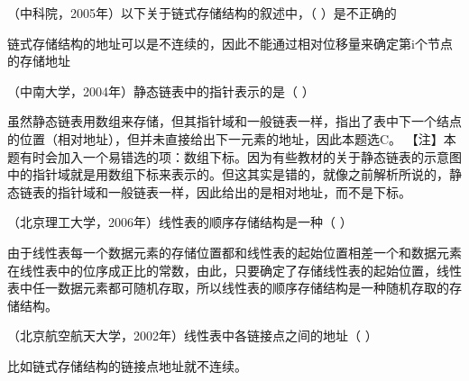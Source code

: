 \question （中科院，2005年）以下关于链式存储结构的叙述中，（ ）是不正确的
\par{}
\begin{solution}链式存储结构的地址可以是不连续的，因此不能通过相对位移量来确定第i个节点的存储地址
\end{solution}
\question （中南大学，2004年）静态链表中的指针表示的是（ ）
\par{}
\begin{solution}虽然静态链表用数组来存储，但其指针域和一般链表一样，指出了表中下一个结点的位置（相对地址），但并未直接给出下一元素的地址，因此本题选C。
【注】本题有时会加入一个易错选的项：数组下标。因为有些教材的关于静态链表的示意图中的指针域就是用数组下标来表示的。但这其实是错的，就像之前解析所说的，静态链表的指针域和一般链表一样，因此给出的是相对地址，而不是下标。
\end{solution}
\question （北京理工大学，2006年）线性表的顺序存储结构是一种（ ）
\par{}
\begin{solution}由于线性表每一个数据元素的存储位置都和线性表的起始位置相差一个和数据元素在线性表中的位序成正比的常数，由此，只要确定了存储线性表的起始位置，线性表中任一数据元素都可随机存取，所以线性表的顺序存储结构是一种随机存取的存储结构。
\end{solution}
\question （北京航空航天大学，2002年）线性表中各链接点之间的地址（ ）
\par{}
\begin{solution}比如链式存储结构的链接点地址就不连续。
\end{solution}
